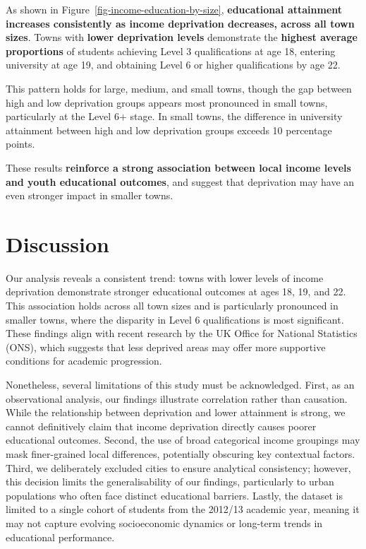 \documentclass[11pt,en]{../resources/elegantpaper}
\begin{document}
As shown in Figure~\ref{fig-income-education-by-size},
\textbf{educational attainment increases consistently as income
deprivation decreases, across all town sizes}. Towns with \textbf{lower
deprivation levels} demonstrate the \textbf{highest average proportions}
of students achieving Level 3 qualifications at age 18, entering
university at age 19, and obtaining Level 6 or higher qualifications by
age 22.

This pattern holds for large, medium, and small towns, though the gap
between high and low deprivation groups appears most pronounced in small
towns, particularly at the Level 6+ stage. In small towns, the
difference in university attainment between high and low deprivation
groups exceeds 10 percentage points.

These results \textbf{reinforce a strong association between local
income levels and youth educational outcomes}, and suggest that
deprivation may have an even stronger impact in smaller towns.

\section{Discussion}\label{discussion}

Our analysis reveals a consistent trend: towns with lower levels of
income deprivation demonstrate stronger educational outcomes at ages 18,
19, and 22. This association holds across all town sizes and is
particularly pronounced in smaller towns, where the disparity in Level 6
qualifications is most significant. These findings align with recent
research by the UK Office for National Statistics (ONS), which suggests
that less deprived areas may offer more supportive conditions for
academic progression.

Nonetheless, several limitations of this study must be acknowledged.
First, as an observational analysis, our findings illustrate correlation
rather than causation. While the relationship between deprivation and
lower attainment is strong, we cannot definitively claim that income
deprivation directly causes poorer educational outcomes. Second, the use
of broad categorical income groupings may mask finer-grained local
differences, potentially obscuring key contextual factors. Third, we
deliberately excluded cities to ensure analytical consistency; however,
this decision limits the generalisability of our findings, particularly
to urban populations who often face distinct educational barriers.
Lastly, the dataset is limited to a single cohort of students from the
2012/13 academic year, meaning it may not capture evolving socioeconomic
dynamics or long-term trends in educational performance.
\end{document}
